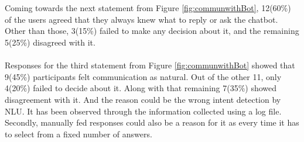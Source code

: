 \\~\\
Coming towards the next statement from Figure \ref{fig:communwithBot}, 12(60\%) of the users agreed that they always knew what to reply or ask the chatbot. Other than those, 3(15\%) failed to make any decision about it, and the remaining 5(25\%) disagreed with it. 
\\~\\
Responses for the third statement from Figure \ref{fig:communwithBot} showed that 9(45\%) participants felt communication as natural. Out of the other 11, only 4(20\%) failed to decide about it. Along with that remaining 7(35\%) showed disagreement with it. And the reason could be the wrong intent detection by NLU. It has been observed through the information collected using a log file. Secondly, manually fed responses could also be a reason for it as every time it has to select from a fixed number of answers.

